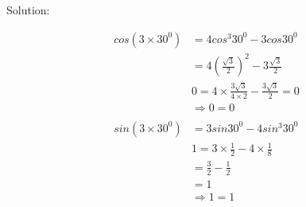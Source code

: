 \documentclass{article}
\begin{document}
{\small Solution:}

\[
  \begin{aligned}
    cos(3 \times 30^{0}) &= 4cos^{3}30^{0} - 3cos30^{0} \\
                         &= 4\left(\frac{\sqrt{3}}{2}\right)^{2} - 3\frac{\sqrt{3}}{2} \\
                         & 0 = 4 \times \frac{3\sqrt{3}}{4\times2} - \frac{3\sqrt{3}}{2} = 0 \\
                         &\Rightarrow 0 = 0 \\
    \\
    sin(3 \times 30^{0}) &= 3sin30^{0} - 4sin^{3}30^{0} \\
                         & 1 = 3 \times \frac{1}{2} - 4 \times \frac{1}{8} \\
                         & = \frac{3}{2} - \frac{1}{2} \\
                         & = 1 \\
                         &\Rightarrow 1 = 1
  \end{aligned}
\]
\end{document}
